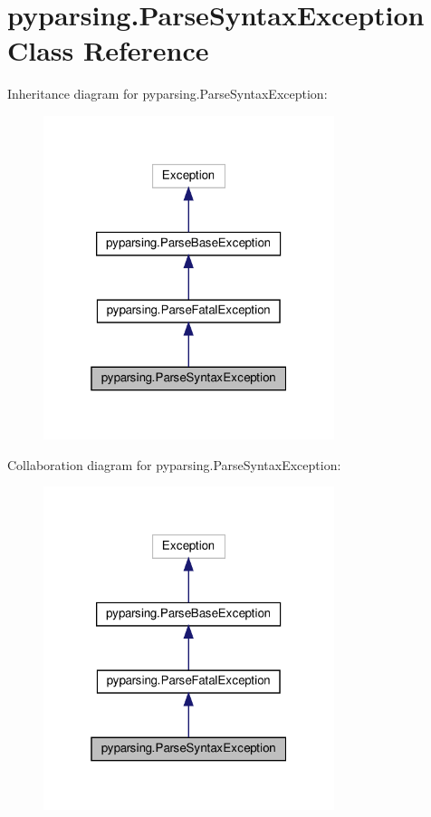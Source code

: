 \hypertarget{classpyparsing_1_1ParseSyntaxException}{}\section{pyparsing.\+Parse\+Syntax\+Exception Class Reference}
\label{classpyparsing_1_1ParseSyntaxException}


Inheritance diagram for pyparsing.\+Parse\+Syntax\+Exception\+:
\nopagebreak
\begin{figure}[H]
\begin{center}
\leavevmode
\includegraphics[width=241pt]{classpyparsing_1_1ParseSyntaxException__inherit__graph}
\end{center}
\end{figure}


Collaboration diagram for pyparsing.\+Parse\+Syntax\+Exception\+:
\nopagebreak
\begin{figure}[H]
\begin{center}
\leavevmode
\includegraphics[width=241pt]{classpyparsing_1_1ParseSyntaxException__coll__graph}
\end{center}
\end{figure}
